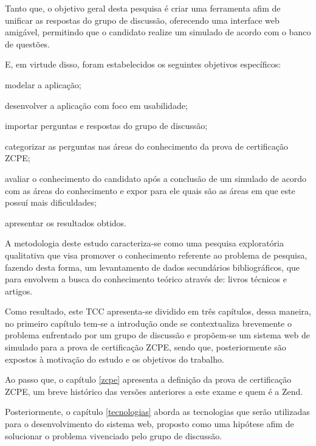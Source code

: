 
Tanto que, o objetivo geral desta pesquisa é criar uma ferramenta afim de
unificar as respostas do grupo de discussão, oferecendo uma interface web
amigável, permitindo que o candidato realize um simulado de
acordo com o banco de questões.


E, em virtude disso, foram estabelecidos os seguintes objetivos
específicos:

\begin{alineas}
    \item modelar a aplicação;
    \item desenvolver a aplicação com foco em usabilidade;
    \item importar perguntas e respostas do grupo de discussão;
    \item categorizar as perguntas nas áreas do conhecimento da prova de
    certificação \acs{ZCPE};
    \item avaliar o conhecimento do candidato após a conclusão de um simulado
    de acordo com as áreas do conhecimento e expor para ele quais são as áreas  em
    que este possuí mais dificuldades;
    \item apresentar os resultados obtidos.
\end{alineas}


A metodologia deste estudo caracteriza-se como uma pesquisa exploratória
qualitativa que visa promover o conhecimento referente ao problema de pesquisa, fazendo desta forma,
um levantamento de dados secundários bibliográficos, que para
 envolvem a busca do conhecimento
teórico através de: livros técnicos e artigos.

Como resultado, este \acs{TCC} apresenta-se dividido em três capítulos, dessa
maneira, no primeiro capítulo tem-se a introdução onde se contextualiza brevemente o problema
enfrentado por um grupo de discussão e propõem-se um sistema web de
simulado para a prova de certificação \acs{ZCPE}, sendo que, posteriormente são
expostos à motivação do estudo e os objetivos do trabalho.

Ao passo que, o capítulo \ref{zcpe} apresenta a definição da prova de
certificação \acl{ZCPE}, um breve histórico das versões anteriores a este
exame e quem é a \acs{Zend}.

Posteriormente, o capítulo \ref{tecnologias} aborda as tecnologias que serão
utilizadas para o desenvolvimento do sistema web, proposto como uma hipótese
afim de solucionar o problema vivenciado pelo grupo de discussão.



